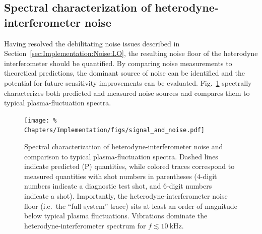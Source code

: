 \subsection{Spectral characterization of heterodyne-interferometer noise}
\label{sec:Implementation:Noise:interferometer}
Having resolved the debilitating noise issues described in
Section~\ref{sec:Implementation:Noise:LO},
the resulting noise floor of the heterodyne interferometer
should be quantified.
By comparing noise measurements to theoretical predictions,
the dominant source of noise can be identified and
the potential for future sensitivity improvements can be evaluated.
Fig.~\ref{fig:Implementation:signal_and_noise}
spectrally characterizes both predicted and measured noise sources and
compares them to typical plasma-fluctuation spectra.

\begin{figure}
  \centering
  \texttt{[image: \%
    Chapters/Implementation/figs/signal\_and\_noise.pdf]}
  \caption[Spectral characterization of heterodyne-interferometer noise]{%
    Spectral characterization of heterodyne-interferometer noise and
    comparison to typical plasma-fluctuation spectra.
    Dashed lines indicate predicted (P) quantities, while
    colored traces correspond to measured quantities
    with shot numbers in parentheses
    ($4$-digit numbers indicate a diagnostic test shot, and
    $6$-digit numbers indicate a \diiid\space shot).
    Importantly, the heterodyne-interferometer noise floor
    (i.e.\ the ``full system'' trace)
    sits at least an order of magnitude below
    typical plasma fluctuations.
    Vibrations dominate the heterodyne-interferometer spectrum
    for $f \lesssim \SI{10}{\kilo\hertz}$.
  }
\label{fig:Implementation:signal_and_noise}
\end{figure}

